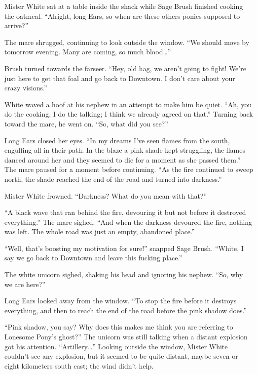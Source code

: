 
Mister White sat at a table inside the shack while Sage Brush finished cooking the oatmeal. ``Alright, long Ears, so when are these others ponies supposed to arrive?''

The mare shrugged, continuing to look outside the window. ``We should move by tomorrow evening. Many are coming, so much blood\dots''

Brush turned towards the farseer. ``Hey, old hag, we aren't going to fight! We're just here to get that foal and go back to Downtown. I don't care about your crazy visions.''

White waved a hoof at his nephew in an attempt to make him be quiet. ``Ah, you do the cooking, I do the talking; I think we already agreed on that.'' Turning back toward the mare, he went on. ``So, what did you see?''

Long Ears closed her eyes. ``In my dreams I've seen flames from the south, engulfing all in their path. In the blaze a pink shade kept struggling, the flames danced around her and they seemed to die for a moment as she passed them.'' The mare paused for a moment before continuing. ``As the fire continued to sweep north, the shade reached the end of the road and turned into darkness.''

Mister White frowned. ``Darkness? What do you mean with that?''

``A black wave that ran behind the fire, devouring it but not before it destroyed everything.'' The mare sighed. ``And when the darkness devoured the fire, nothing was left. The whole road was just an empty, abandoned place.''

``Well, that's boosting my motivation for sure!'' snapped Sage Brush. ``White, I say we go back to Downtown and leave this fucking place.''

The white unicorn sighed, shaking his head and ignoring his nephew. ``So, why we are here?''

Long Ears looked away from the window. ``To stop the fire before it destroys everything, and then to reach the end of the road before the pink shadow does.''

``Pink shadow, you say? Why does this makes me think you are referring to Lonesome Pony's ghost?'' The unicorn was still talking when a distant explosion got his attention. ``Artillery\dots'' Looking outside the window, Mister White couldn't see any explosion, but it seemed to be quite distant, maybe seven or eight kilometers south east; the wind didn't help.

